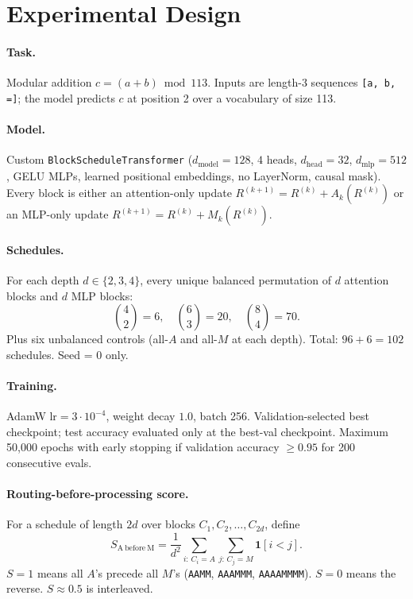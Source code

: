 \documentclass[10pt]{article}
\begin{document}
\section{Experimental Design}

\paragraph{Task.}
Modular addition $c = (a + b) \bmod 113$. Inputs are length-3 sequences \texttt{[a, b, =]}; the model predicts $c$ at position 2 over a vocabulary of size 113.

\paragraph{Model.}
Custom \texttt{BlockScheduleTransformer} ($d_\text{model}=128$, $4$ heads, $d_\text{head}=32$, $d_\text{mlp}=512$, GELU MLPs, learned positional embeddings, no LayerNorm, causal mask). Every block is either an attention-only update $R^{(k+1)} = R^{(k)} + A_k(R^{(k)})$ or an MLP-only update $R^{(k+1)} = R^{(k)} + M_k(R^{(k)})$.

\paragraph{Schedules.}
For each depth $d \in \{2,3,4\}$, every unique balanced permutation of $d$ attention blocks and $d$ MLP blocks:
\[
\binom{4}{2} = 6, \quad \binom{6}{3} = 20, \quad \binom{8}{4} = 70.
\]
Plus six unbalanced controls (all-$A$ and all-$M$ at each depth). Total: $96 + 6 = 102$ schedules. Seed = 0 only.

\paragraph{Training.}
AdamW $\mathrm{lr}=3 \cdot 10^{-4}$, weight decay $1.0$, batch 256. Validation-selected best checkpoint; test accuracy evaluated only at the best-val checkpoint. Maximum 50{,}000 epochs with early stopping if validation accuracy $\geq 0.95$ for 200 consecutive evals.

\paragraph{Routing-before-processing score.}
For a schedule of length $2d$ over blocks $C_1, C_2, \ldots, C_{2d}$, define
\[
S_{\mathrm{A\ before\ M}}
= \frac{1}{d^2}
\sum_{i:\,C_i=A} \sum_{j:\,C_j=M} \mathbf{1}[i<j].
\]
$S = 1$ means all $A$'s precede all $M$'s (\texttt{AAMM}, \texttt{AAAMMM}, \texttt{AAAAMMMM}). $S = 0$ means the reverse. $S \approx 0.5$ is interleaved.
\end{document}
